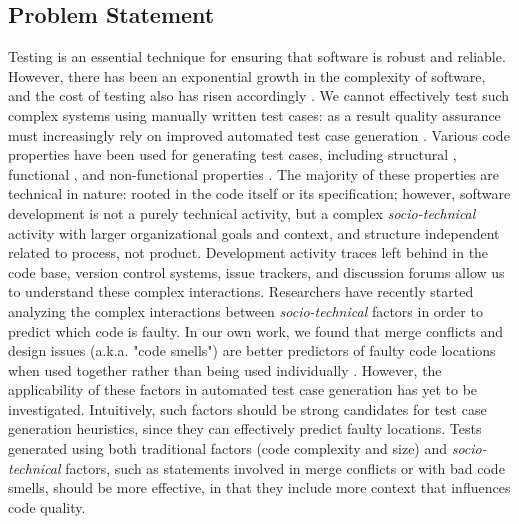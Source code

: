 \documentclass[10pt]{article}
\begin{document}
\subsection{Problem Statement}
Testing is an essential technique for ensuring that software is robust and reliable. However, there has been an exponential growth in the complexity of software, and the cost of testing also has risen accordingly \cite{myers2011art}. We cannot effectively test such complex systems using manually written test cases: as a result quality assurance must increasingly rely on improved automated test case generation \cite{anand2013orchestrated,harman2012search}. Various code properties have been used for generating test cases, including
structural \cite{tonella2004evolutionary}, functional \cite{wegener2004evaluation}, and non-functional properties \cite{wegener1998verifying}. The majority of these properties are technical in nature:  rooted in the code itself or its specification; however, software development is not a purely technical activity, but a complex \emph{socio-technical} activity with larger organizational goals and context, and structure independent related to process, not product. Development activity traces left behind in the code base, version control systems, issue trackers, and discussion forums allow us to understand these complex interactions. Researchers have recently started analyzing the complex interactions between \emph{socio-technical} factors in order to predict which code is faulty. In our own work, we found that merge conflicts and design issues (a.k.a. "code smells") are better predictors of faulty code locations when used together rather than being used individually \cite{ahmedempirical} . However, the applicability of these factors in automated test case generation has yet to be investigated. Intuitively, such factors should be strong candidates for test case generation heuristics, since they can effectively predict faulty locations. Tests generated using both traditional factors (code complexity and size) and \emph{socio-technical} factors, such as statements involved in merge conflicts or with bad code smells, should be more effective, in that they include more context that influences code quality.

\end{document}
